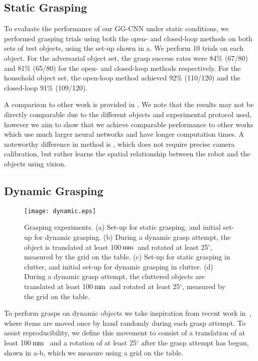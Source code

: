 \documentclass[conference]{IEEEtran}
\newcommand{\pack}	{\hspace{-0.08em}}
\newcommand{\mm}	{\ensuremath{\rm\,m\pack m}}
\begin{document}
\subsection{Static Grasping}
\label{sec:baseline}

To evaluate the performance of our GG-CNN under static conditions, we performed grasping trials using both the open- and closed-loop methods on both sets of test objects, using the set-up shown in a. We perform 10 trials on each object.  For the adversarial object set, the grasp success rates were 84\% (67/80) and 81\% (65/80) for the open- and closed-loop methods respectively.  For the household object set, the open-loop method achieved 92\% (110/120) and the closed-loop 91\% (109/120).  

A comparison to other work is provided in .  We note that the results may not be directly comparable due to the different objects and experimental protocol used, however we aim to show that we achieve comparable performance to other works which use much larger neural networks and have longer computation times. A noteworthy difference in method is \cite{Levine2017LearningCollection}, which does not require precise camera calibration, but rather learns the spatial relationship between the robot and the objects using vision.

\subsection{Dynamic Grasping}
\label{sec:dynamic}

\begin{figure}[tpb]
    \centering
    \texttt{[image: dynamic.eps]}
    \vspace{-8mm}
    \caption{Grasping experiments. (a) Set-up for static grasping, and initial set-up for dynamic grasping. (b) During a dynamic grasp attempt, the object is translated at least 100\mm~and rotated at least 25$^\circ$, measured by the grid on the table.  (c) Set-up for static grasping in clutter, and initial set-up for dynamic grasping in clutter.  (d) During a dynamic grasp attempt, the cluttered objects are translated at least 100\mm~and rotated at least 25$^\circ$, measured by the grid on the table.
    }
    \label{fig:dynamic} 
    \vspace{-6mm}
\end{figure}

To perform grasps on dynamic objects we take inspiration from recent work in~\cite{Viereck2017LearningImages}, where items are moved once by hand randomly during each grasp attempt.  To assist reproducibility, we define this movement to consist of a translation of at least 100\mm~ and a rotation of at least 25$^\circ$ after the grasp attempt has begun, shown in a-b, which we measure using a grid on the table.    
\end{document}
